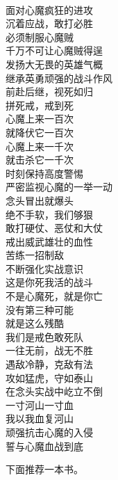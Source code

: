 \begin{poem}[戒色敢死队]
    \begin{multicols}{2}
        \begin{center}~\\
            面对心魔疯狂的进攻 \\ 沉着应战，敢打必胜 \\ 必须制服心魔贼 \\ 千万不可让心魔贼得逞 \\ 发扬大无畏的英雄气概 \\ 继承英勇顽强的战斗作风 \\ 前赴后继，视死如归 \\ 拼死戒，戒到死 \\ 心魔上来一百次 \\ 就降伏它一百次 \\ 心魔上来一千次 \\ 就击杀它一千次 \\ 时刻保持高度警惕 \\ 严密监视心魔的一举一动 \\ 念头冒出就爆头 \\ 绝不手软，我们够狠 \\ 敢打硬仗、恶仗和大仗 \\ 戒出威武雄壮的血性 \\ 苦练一招制敌 \\ 不断强化实战意识 \\ 这是你死我活的战斗 \\ 不是心魔死，就是你亡 \\ 没有第三种可能 \\ 就是这么残酷 \\ 我们是戒色敢死队 \\ 一往无前，战无不胜 \\ 遇敌冷静，克敌有法 \\ 攻如猛虎，守如泰山 \\ 在念头实战中屹立不倒 \\ 一寸河山一寸血 \\ 我以我血复河山 \\ 顽强抗击心魔的入侵 \\ 誓与心魔血战到底
        \end{center}
    \end{multicols}
\end{poem}

下面推荐一本书。

